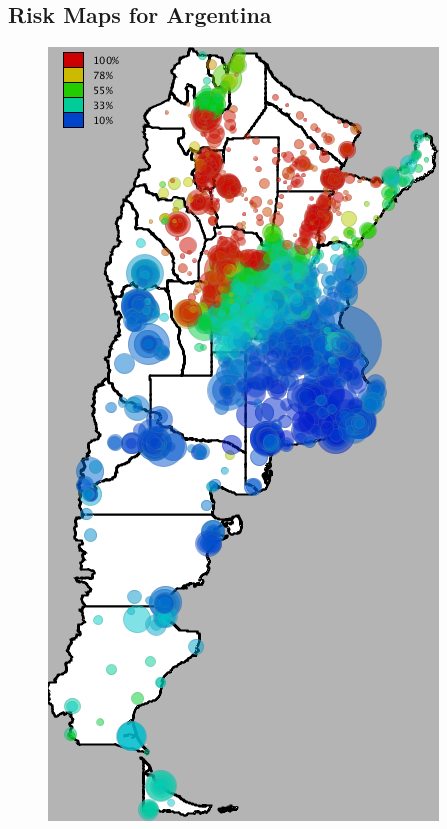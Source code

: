 \subsection{Risk Maps for Argentina}


\begin{figure}[h!]
	
	\begin{minipage}{.495\linewidth}
		\centering
		\includegraphics[width=0.90\linewidth]
		{figures/201112_hi_res_argentina_usuarios_proporcion_circulos_beta1/201112_hi_res_argentina_usuarios_proporcion_circulos_beta1}
		

\end{minipage}
\end{figure}
